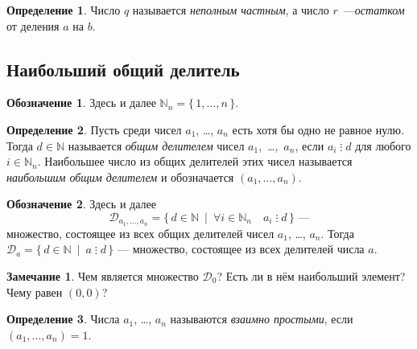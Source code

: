 \documentclass[14pt, a4paper]{extarticle}
\theoremstyle{definition}
\newtheorem*{definition}{Определение}
\newtheorem*{remark}{Замечание}
\newtheorem*{desig}{Обозначение}
\newcommand{\divisible}{\mathop{\vdots}}
\begin{document}
	\begin{definition}
		Число $q$ называется \emph{неполным частным}, а число $r$~---\emph{остатком} от деления $a$ на $b$.
	\end{definition}

\subsection{Наибольший общий делитель}
\label{nod}
	
	\begin{desig}
		Здесь и далее $\mathbb{N}_n=\{\,1,\dots,n\,\}$.
	\end{desig}
	
	\begin{definition}
		Пусть среди чисел $a_1$, \dots, $a_n$ есть хотя бы одно не равное нулю. Тогда $d\in\mathbb{N}$ называется \emph{общим делителем} чисел \mbox{$a_1$, \dots, $a_n$}, если $a_i\divisible d$ для любого $i\in\mathbb{N}_n$. Наибольшее число из общих делителей этих чисел называется \emph{наибольшим общим делителем} и обозначается $(a_1,\dots,a_n)$.
	\end{definition}

	\begin{desig}
		Здесь и далее $$\mathcal{D}_{a_1,\dots,a_n}=\{\,d\in\mathbb{N}\:\mid\:\forall i\in\mathbb{N}_n\quad a_i\divisible d\,\}\text{ ---}$$ множество, состоящее из всех общих делителей чисел $a_1$, \dots, $a_n$. Тогда $\mathcal{D}_a=\{\,d\in\mathbb{N}\:\mid\:a\divisible d\,\}$ --- множество, состоящее из всех делителей числа $a$.
	\end{desig}

	\begin{remark}
		Чем является множество $\mathcal{D}_0$? Есть ли в нём наибольший элемент? Чему равен $(0,0)$?
	\end{remark}

	\begin{definition}
		Числа $a_1$, \dots, $a_n$ называются \emph{взаимно простыми}, если $(a_1,\dots,a_n)=1$.
	\end{definition}
\end{document}
